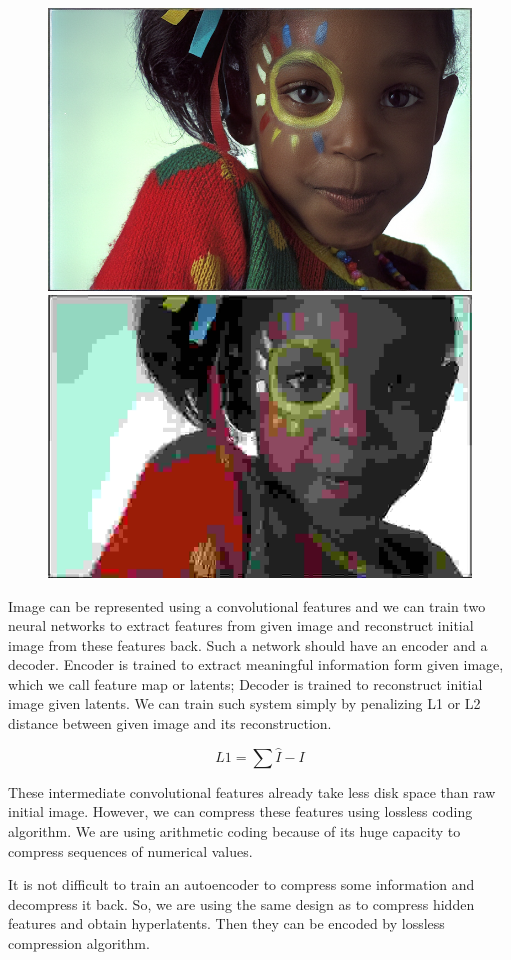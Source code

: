 \begin{figure}[!ht]
    \centering
    \includegraphics[width=.45\textwidth]{figure/kodim15_HiFiC_Lo.png}
    \includegraphics[width=.45\textwidth]{figure/kodim15_jpg_1x_0.166.jpg}
    \caption{}
    \label{jpeg-hific-comparision}
\end{figure}

Image can be represented using a convolutional features and we can train two neural networks to extract features from given image and reconstruct initial image from these features back. Such a network should have an encoder and a decoder. Encoder is trained to extract meaningful information form given image, which we call feature map or latents; Decoder is trained to reconstruct initial image given latents. We can train such system simply by penalizing L1 or L2 distance between given image and its reconstruction.

\begin{equation}
    \label{eq:1}
    L1=\sum \hat{I}-I
\end{equation}

These intermediate convolutional features already take less disk space than raw initial image. However, we can compress these features using lossless coding algorithm. We are using arithmetic coding because of its huge capacity to compress sequences of numerical values.

It is not difficult to train an autoencoder to compress some information and decompress it back. So, we are using the same design as \cite{Ballé_Minnen_Singh_Hwang_Johnston_2018} to compress hidden features and obtain hyperlatents. Then they can be encoded by lossless compression algorithm.

